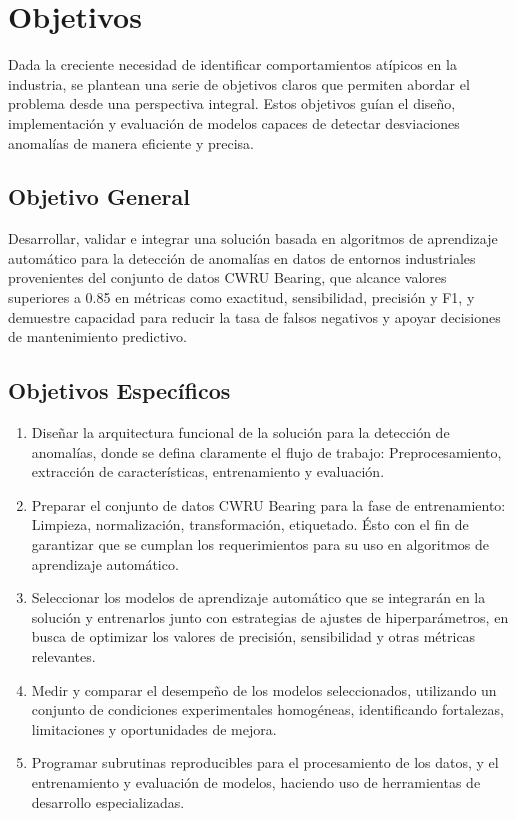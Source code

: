 \documentclass[11pt,a4paper,spanish]{book}
\numberwithin{equation}{chapter}
\numberwithin{figure}{chapter}
\begin{document}
\chapter{Objetivos}

Dada la creciente necesidad de identificar comportamientos atípicos en la industria, 
se plantean una serie de objetivos claros que permiten abordar el problema desde una 
perspectiva integral. 
Estos objetivos guían el diseño, implementación y evaluación de modelos capaces de 
detectar desviaciones anomalías de manera eficiente y precisa.


\section{Objetivo General}

Desarrollar, validar e integrar una solución basada en algoritmos de aprendizaje automático para la detección de anomalías en datos de entornos industriales provenientes del conjunto de datos CWRU Bearing, que alcance valores superiores a 0.85 en métricas como exactitud, sensibilidad, precisión y F1, y demuestre capacidad para reducir la tasa de falsos negativos y apoyar decisiones de mantenimiento predictivo.

\section{Objetivos Específicos}

\begin{enumerate}

\item Diseñar la arquitectura funcional de la solución para la detección de anomalías, 
donde se defina claramente el flujo de trabajo: Preprocesamiento, 
extracción de características, entrenamiento y evaluación.


\item Preparar el conjunto de datos CWRU Bearing para la fase de entrenamiento: 
Limpieza, normalización, transformación, etiquetado. Ésto con el fin de garantizar que 
se cumplan los requerimientos para su uso en algoritmos de aprendizaje automático.  


\item Seleccionar los modelos de aprendizaje automático que se integrarán en la solución y entrenarlos junto con estrategias de ajustes de hiperparámetros, en busca de optimizar los valores de precisión, sensibilidad y otras métricas relevantes.


\item Medir y comparar el desempeño de los modelos seleccionados, utilizando un 
conjunto de condiciones experimentales homogéneas, identificando fortalezas, 
limitaciones y oportunidades de mejora.


\item Programar subrutinas reproducibles para el procesamiento de los datos, y el entrenamiento y evaluación de modelos, haciendo uso de herramientas de desarrollo especializadas.


\end{enumerate}
\end{document}
